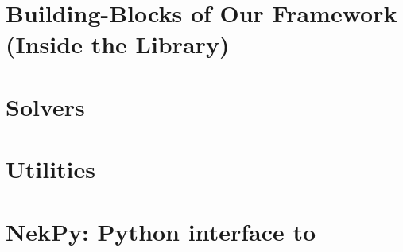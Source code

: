 


%

%

\part{Building-Blocks of Our Framework (Inside the Library)} \label{part:library}



\part{Solvers} \label{part:solvers}



\part{Utilities} \label{part:utilities}



\part{NekPy: Python interface to \nek{}} \label{part:nekpy}





 

\printindex


